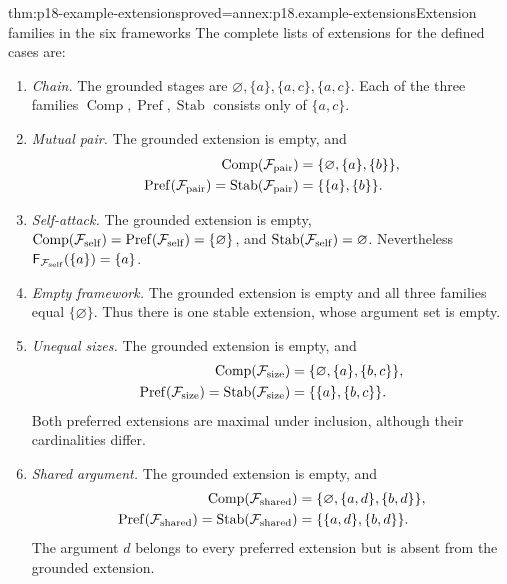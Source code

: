 \begin{hbtheorem}{thm:p18-example-extensions}{proved=annex:p18.example-extensions}{Extension families in the six frameworks}
The complete lists of extensions for the defined cases are:
\begin{enumerate}
\item \emph{Chain.} The grounded stages are
      \(\varnothing,\{a\},\{a,c\},\{a,c\}\). Each of the three
      families \(\operatorname{Comp},\operatorname{Pref},\operatorname{Stab}\)
      consists only of \(\{a,c\}\).
\item \emph{Mutual pair.} The grounded extension is empty, and
      \[
      \begin{aligned}
       \operatorname{Comp}(\mathcal F_{\rm pair})
          &=\{\varnothing,\{a\},\{b\}\},\\
       \operatorname{Pref}(\mathcal F_{\rm pair})
          =\operatorname{Stab}(\mathcal F_{\rm pair})
          &=\{\{a\},\{b\}\}.
      \end{aligned}
      \]
\item \emph{Self-attack.} The grounded extension is empty,
      \(\operatorname{Comp}(\mathcal F_{\rm self})
        =\operatorname{Pref}(\mathcal F_{\rm self})=\{\varnothing\}\),
      and \(\operatorname{Stab}(\mathcal F_{\rm self})=\varnothing\).
      Nevertheless \(\mathsf F_{\mathcal F_{\rm self}}(\{a\})=\{a\}\).
\item \emph{Empty framework.} The grounded extension is empty and all
      three families equal \(\{\varnothing\}\). Thus there is one
      stable extension, whose argument set is empty.
\item \emph{Unequal sizes.} The grounded extension is empty, and
      \[
      \begin{aligned}
       \operatorname{Comp}(\mathcal F_{\rm size})
          &=\{\varnothing,\{a\},\{b,c\}\},\\
       \operatorname{Pref}(\mathcal F_{\rm size})
          =\operatorname{Stab}(\mathcal F_{\rm size})
          &=\{\{a\},\{b,c\}\}.
      \end{aligned}
      \]
      Both preferred extensions are maximal under inclusion, although their
      cardinalities differ.
\item \emph{Shared argument.} The grounded extension is empty,
      and
      \[
      \begin{aligned}
       \operatorname{Comp}(\mathcal F_{\rm shared})
          &=\{\varnothing,\{a,d\},\{b,d\}\},\\
       \operatorname{Pref}(\mathcal F_{\rm shared})
          =\operatorname{Stab}(\mathcal F_{\rm shared})
          &=\{\{a,d\},\{b,d\}\}.
      \end{aligned}
      \]
      The argument \(d\) belongs to every preferred extension but is absent
      from the grounded extension.
\end{enumerate}
\end{hbtheorem}

